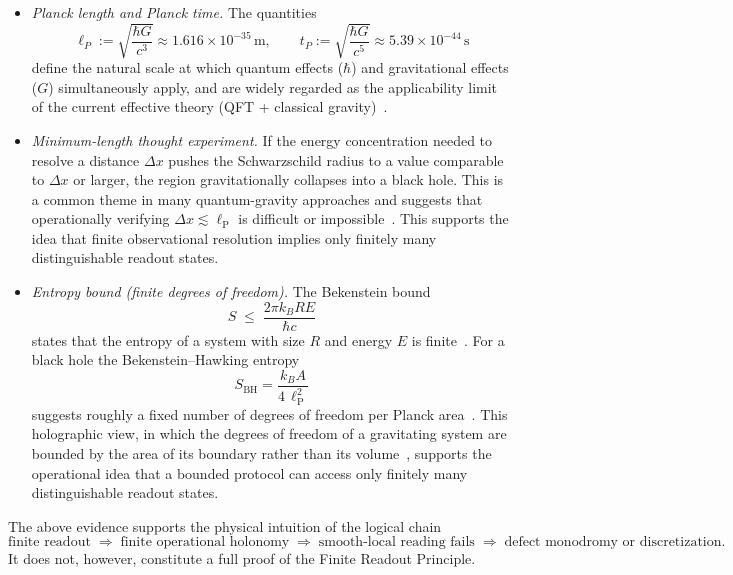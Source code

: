 \documentclass[sn-mathphys-num,Numbered]{sn-jnl}
\theoremstyle{thmstyleone}
\theoremstyle{thmstylethree}
\theoremstyle{thmstyletwo}
\begin{document}
\begin{itemize}
  \item \textit{Planck length and Planck time.}
    The quantities
    \[
      \ell_P := \sqrt{\frac{\hbar G}{c^3}} \approx 1.616\times10^{-35}\,\mathrm{m},
      \qquad
      t_P := \sqrt{\frac{\hbar G}{c^5}} \approx 5.39\times10^{-44}\,\mathrm{s}
    \]
    define the natural scale at which quantum effects ($\hbar$) and
    gravitational effects ($G$) simultaneously apply, and are widely
    regarded as the applicability limit of the current effective theory
    (QFT + classical gravity)~\cite{Planck1899}.

  \item \textit{Minimum-length thought experiment.}
    If the energy concentration needed to resolve a distance $\Delta x$
    pushes the Schwarzschild radius to a value comparable to $\Delta x$
    or larger, the region gravitationally collapses into a black hole.
    This is a common theme in many quantum-gravity approaches and
    suggests that operationally verifying $\Delta x \lesssim
    \ell_{\mathrm{P}}$ is difficult or impossible~\cite{Maggiore1994}.
    This supports the idea that finite observational resolution implies
    only finitely many distinguishable readout states.

  \item \textit{Entropy bound (finite degrees of freedom).}
    The Bekenstein bound
    \[
      S \;\le\; \frac{2\pi k_B R E}{\hbar c}
    \]
    states that the entropy of a system with size $R$ and energy $E$ is
    finite~\cite{Bekenstein1981}. For a black hole the Bekenstein--Hawking
    entropy
    \[
      S_{\mathrm{BH}} = \frac{k_B A}{4\,\ell_{\mathrm{P}}^2}
    \]
    suggests roughly a fixed number of degrees of freedom per Planck
    area~\cite{Hawking1975}. This holographic view, in which the degrees
    of freedom of a gravitating system are bounded by the area of its
    boundary rather than its volume~\cite{tHooft1993,Susskind1995,Bousso2002},
    supports the operational idea that a bounded protocol can access
    only finitely many distinguishable readout states.
\end{itemize}

The above evidence supports the physical intuition of the logical chain
\[
\text{finite readout} \;\Longrightarrow\; \text{finite operational holonomy}
\;\Longrightarrow\; \text{smooth-local reading fails}
\;\Longrightarrow\; \text{defect monodromy or discretization}.
\]
It does not, however, constitute a full proof of the Finite Readout
Principle.
\end{document}
